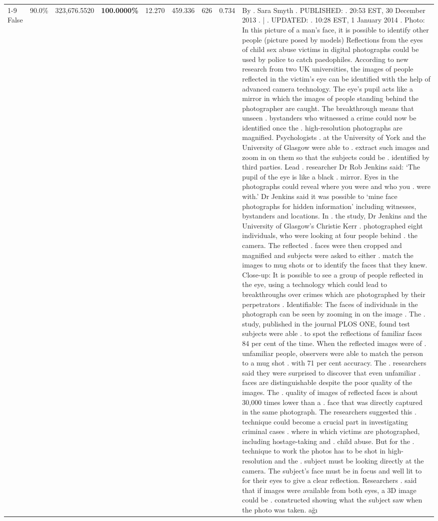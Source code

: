 \begin{table}[H]
\begin{tabular}{lllrlllll}
\cline{1-9}
False & 90.0\% & 323,676.5520 & \bfseries \color{red} 100.0000\% & 12.270 & 459.336 & 626 & 0.734 & By . Sara Smyth . PUBLISHED: . 20:53 EST, 30 December 2013 . | . UPDATED: . 10:28 EST, 1 January 2014 . Photo: In this picture of a man's face, it is possible to identify other people (picture posed by models) Reflections from the eyes of child sex abuse victims in digital photographs could be used by police to catch paedophiles. According to new research from two UK universities, the images of people reflected in the victim's eye can be identified with the help of advanced camera technology. The eye's pupil acts like a mirror in which the images of people standing behind the photographer are caught. The breakthrough means that unseen . bystanders who witnessed a crime could now be identified once the . high-resolution photographs are magnified. Psychologists . at the University of York and the University of Glasgow were able to . extract such images and zoom in on them so that the subjects could be . identified by third parties. Lead . researcher Dr Rob Jenkins said: ‘The pupil of the eye is like a black . mirror. Eyes in the photographs could reveal where you were and who you . were with.' Dr Jenkins said it was possible to ‘mine face photographs for hidden information' including witnesses, bystanders and locations. In . the study, Dr Jenkins and the University of Glasgow's Christie Kerr . photographed eight individuals, who were looking at four people behind . the camera. The reflected . faces were then cropped and magnified and subjects were asked to either . match the images to mug shots or to identify the faces that they knew. Close-up: It is possible to see a group of people reflected in the eye, using a technology which could lead to breakthroughs over crimes which are photographed by their perpetrators . Identifiable: The faces of individuals in the photograph can be seen by zooming in on the image . The . study, published in the journal PLOS ONE, found test subjects were able . to spot the reflections of familiar faces 84 per cent of the time. When the reflected images were of . unfamiliar people, observers were able to match the person to a mug shot . with 71 per cent accuracy. The . researchers said they were surprised to discover that even unfamiliar . faces are distinguishable despite the poor quality of the images. The . quality of images of reflected faces is about 30,000 times lower than a . face that was directly captured in the same photograph. The researchers suggested this . technique could become a crucial part in investigating criminal cases . where in which victims are photographed, including hostage-taking and . child abuse. But for the . technique to work the photos has to be shot in high-resolution and the . subject must be looking directly at the camera. The subject's face must be in focus and well lit to for their eyes to give a clear reflection. Researchers . said that if images were available from both eyes, a 3D image could be . constructed showing what the subject saw when the photo was taken. ağı \\

\end{tabular}
\end{table}
